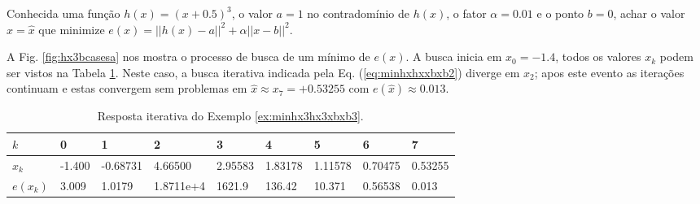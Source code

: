 \begin{example}\label{ex:minhx3hx3xbxb3}
Conhecida uma função $h(x)=(x+0.5)^3$, o valor $a=1$ no contradomínio de $h(x)$,
o fator $\alpha=0.01$ e o ponto $b=0$,
achar o valor $x=\hat{x}$ que minimize $e(x)=||h(x)-a||^2+\alpha||x-b||^2$.
\end{example}
\begin{SolutionT}\label{sol:minhx3hx3xbxb3}
 A Fig. \ref{fig:hx3bcasesa} nos mostra o processo de busca de um mínimo
 de $e(x)$. 
 A busca inicia em $x_0=-1.4$,
 todos os valores $x_{k}$ podem ser vistos na Tabela \ref{tab:hx3bcases3}. 
Neste caso, a busca iterativa indicada pela Eq. (\ref{eq:minhxhxxbxb2}) diverge
em $x_2$; apos este evento as iterações continuam e estas convergem sem problemas 
em $\hat{x}\approx x_7=+0.53255$ com $e(\hat{x})\approx 0.013$.

\end{SolutionT}

\begin{table}[!h]
\centering
\begin{tabular}{|l|l|l|l|l|l|l|l|l|}
\hline
$k$      & 0 & 1 & 2 & 3 & 4 & 5 & 6 & 7 \\ \hline
$x_k$    & -1.400 & -0.68731 & 4.66500 & 2.95583 & 1.83178 & 1.11578 & 0.70475   & 0.53255 \\ \hline
$e(x_k)$ & 3.009 & 1.0179 & 1.8711e+4 & 1621.9 & 136.42 & 10.371 & 0.56538 & 0.013 \\ \hline
\end{tabular}
\caption{Resposta iterativa do Exemplo \ref{ex:minhx3hx3xbxb3}.}
\label{tab:hx3bcases3}
\end{table}

